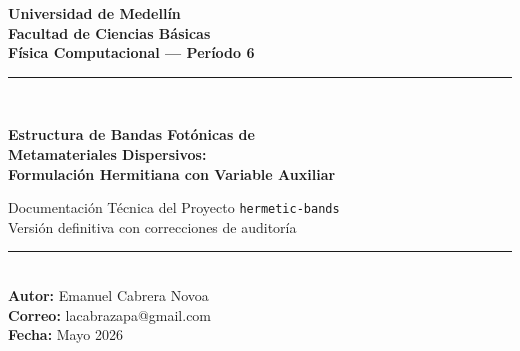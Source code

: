 \documentclass[12pt,a4paper]{article}
\newcommand{\vect}[1]{\bm{#1}}
\begin{document}

\begin{titlepage}
  \centering
  \vspace*{2cm}
  {\Large\bfseries Universidad de Medellín\\[0.3cm]
  Facultad de Ciencias Básicas\\[0.3cm]
  Física Computacional --- Período 6\par}
  \vspace{2cm}
  \rule{\linewidth}{0.5pt}\\[0.4cm]
  {\LARGE\bfseries Estructura de Bandas Fotónicas de\\[0.3cm]
  Metamateriales Dispersivos:\\[0.3cm]
  Formulación Hermitiana con Variable Auxiliar\par}
  {\large Documentación Técnica del Proyecto \texttt{hermetic-bands}\\
  Versión definitiva con correcciones de auditoría\par}
  \rule{\linewidth}{0.5pt}\\[1.5cm]
  {\large\bfseries Autor:} Emanuel Cabrera Novoa\\[0.3cm]
  {\large\bfseries Correo:} lacabrazapa@gmail.com\\[0.3cm]
  {\large\bfseries Fecha:} Mayo 2026\\[2cm]
  \begin{abstract}
    \noindent
    Este documento describe la implementación computacional del método de
    Raman y Fan~\cite{Raman2010} para el cálculo de estructuras de bandas
    fotónicas en cristales plasmónicos dispersivos.
    La formulación transforma el problema de autovalores no-Hermitiano
    $\omega^2 \varepsilon(\omega) \vect{E} = c^{-2}\nabla\times\nabla\times\vect{E}$
    en el problema Hermitiano definido-positivo
    $\omega\, \hat{H}\, \hat{y} = \omega\, \hat{y}$
    mediante la introducción de un campo auxiliar vectorial $\vect{V}$
    que absorbe la dinámica del modelo de Drude.
    Se detallan la discretización mediante la malla de Yee estacionada,
    la construcción de operadores de rotacional con condiciones de contorno
    de Bloch, el ensamblado en formato CSR, y la resolución mediante
    ARPACK con inversión espectral (shift-invert) y factorización LU densa
    (LAPACK \texttt{zgetrf}/\texttt{zgetrs}).
    Se documenta además la corrección de dos errores críticos identificados
    en la auditoría del código: la doble transformación espectral en
    \texttt{zneupd} (modo 3) y la selección errónea del criterio
    \texttt{"LM"} de ARPACK.
  \end{abstract}
\end{titlepage}
\end{document}
